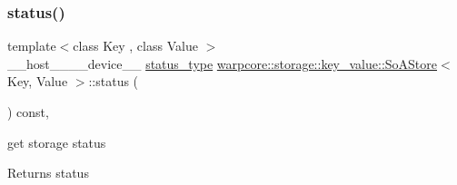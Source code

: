 \subsubsection{\texorpdfstring{status()}{status()}}
{\footnotesize\ttfamily template$<$class Key , class Value $>$ \\
\+\_\+\+\_\+host\+\_\+\+\_\+\+\_\+\+\_\+device\+\_\+\+\_\+ \hyperlink{classwarpcore_1_1Status}{status\+\_\+type} \hyperlink{classwarpcore_1_1storage_1_1key__value_1_1SoAStore}{warpcore\+::storage\+::key\+\_\+value\+::\+So\+A\+Store}$<$ Key, Value $>$\+::status (\begin{DoxyParamCaption}{ }\end{DoxyParamCaption}) const\hspace{0.3cm}{\ttfamily [inline]}, {\ttfamily [noexcept]}}



get storage status 

\begin{DoxyReturn}{Returns}
status 
\end{DoxyReturn}

